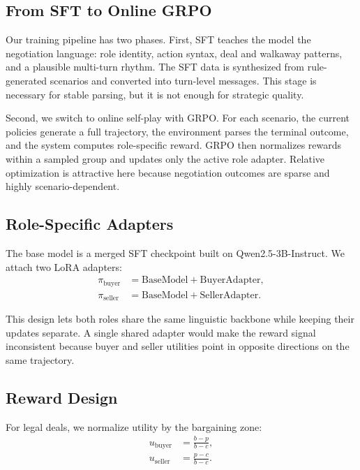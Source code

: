 \documentclass[11pt]{article}
\begin{document}
\subsection{From SFT to Online GRPO}

Our training pipeline has two phases. First, SFT teaches the model the negotiation language: role identity, action syntax, deal and walkaway patterns, and a plausible multi-turn rhythm. The SFT data is synthesized from rule-generated scenarios and converted into turn-level messages. This stage is necessary for stable parsing, but it is not enough for strategic quality.

Second, we switch to online self-play with GRPO. For each scenario, the current policies generate a full trajectory, the environment parses the terminal outcome, and the system computes role-specific reward. GRPO then normalizes rewards within a sampled group and updates only the active role adapter. Relative optimization is attractive here because negotiation outcomes are sparse and highly scenario-dependent.

\subsection{Role-Specific Adapters}

The base model is a merged SFT checkpoint built on Qwen2.5-3B-Instruct. We attach two LoRA adapters:
\begin{align}
    \pi_{\text{buyer}} &= \text{BaseModel} + \text{BuyerAdapter}, \\
    \pi_{\text{seller}} &= \text{BaseModel} + \text{SellerAdapter}.
\end{align}

This design lets both roles share the same linguistic backbone while keeping their updates separate. A single shared adapter would make the reward signal inconsistent because buyer and seller utilities point in opposite directions on the same trajectory.

\subsection{Reward Design}

For legal deals, we normalize utility by the bargaining zone:
\begin{align}
    u_{\text{buyer}} &= \frac{b-p}{b-c}, \\
    u_{\text{seller}} &= \frac{p-c}{b-c}.
\end{align}
\end{document}
